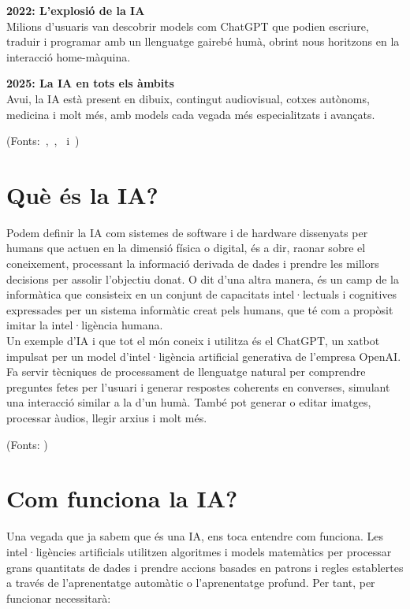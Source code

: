 \begin{enumerate}
    \textbf{2022: L'explosió de la IA}\\
    Milions d'usuaris van descobrir models com ChatGPT que podien escriure, traduir i programar amb un llenguatge gairebé humà, obrint nous horitzons en la interacció home-màquina.

    \textbf{2025: La IA en tots els àmbits}\\
    Avui, la IA està present en dibuix, contingut audiovisual, cotxes autònoms, medicina i molt més, amb models cada vegada més especialitzats i avançats.
\end{enumerate}

(Fonts:~\cite{McCarthy_Minsky_Rochester_Shannon_2006},~\cite{deepblue},~\cite{chatGPT2022} i~\cite{10.1093/mind/LIX.236.433})

\section{Què és la IA?}

Podem definir la IA com sistemes de software i de hardware dissenyats per humans que actuen en la dimensió física o digital, és a dir, raonar sobre el coneixement, processant la informació derivada de dades i prendre les millors decisions per assolir l'objectiu donat. O dit d'una altra manera, és un camp de la informàtica que consisteix en un conjunt de capacitats intel·lectuals i cognitives expressades per un sistema informàtic creat pels humans, que té com a propòsit imitar la intel·ligència humana.\\

Un exemple d'IA i que tot el món coneix i utilitza és el ChatGPT, un xatbot impulsat per un model d'intel·ligència artificial generativa de l'empresa OpenAI. Fa servir tècniques de processament de llenguatge natural per comprendre preguntes fetes per l'usuari i generar respostes coherents en converses, simulant una interacció similar a la d'un humà. També pot generar o editar imatges, processar àudios, llegir arxius i molt més.

\par(Fonts: \cite{QueÉsLaIA})
\section{Com funciona la IA?}

Una vegada que ja sabem que és una IA, ens toca entendre com funciona. Les intel·ligències artificials utilitzen algoritmes i models matemàtics per processar grans quantitats de dades i prendre accions basades en patrons i regles establertes a través de l'aprenentatge automàtic o l'aprenentatge profund. Per tant, per funcionar necessitarà:

